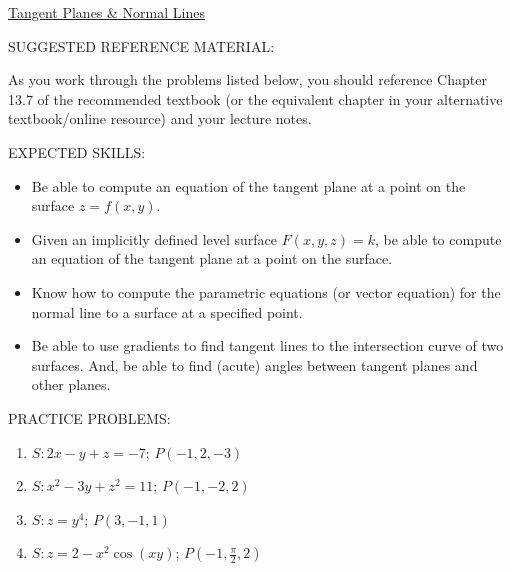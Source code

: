 \documentclass[12pt]{article}
\begin{document}
\begin{center}
\underline{\LARGE{Tangent Planes \& Normal Lines}}
\end{center}

\noindent SUGGESTED REFERENCE MATERIAL:

\bigskip

\noindent As you work through the problems listed below, you should reference Chapter 13.7 of the recommended textbook (or the equivalent chapter in your alternative textbook/online resource) and your lecture notes.

\bigskip


\noindent EXPECTED SKILLS:

\begin{itemize}

\item Be able to compute an equation of the tangent plane at a point on the surface $z=f(x,y)$. 

\item Given an implicitly defined level surface $F(x,y,z)=k$, be able to compute an equation of the tangent plane at a point on the surface. 

\item Know how to compute the parametric equations (or vector equation) for the normal line to a surface at a specified point. 

\item Be able to use gradients to find tangent lines to the intersection curve of two surfaces. And, be able to find (acute) angles between tangent planes and other planes.

\end{itemize}

\noindent PRACTICE PROBLEMS:

\medskip


\begin{enumerate}

\item $S: 2x-y+z=-7$; $P(-1,2,-3)$


\item $S: x^2-3y+z^2=11$; $P(-1,-2,2)$


\item $S: z=y^4$; $P(3,-1,1)$


\item $S: z=2-x^2\cos{(xy)}$; $P\left(-1,\frac{\pi}{2},2\right)$


\end{enumerate}
\end{document}
